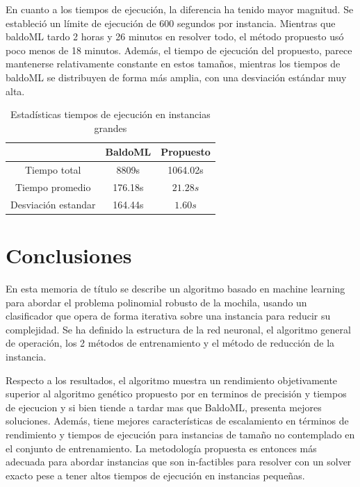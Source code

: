 \documentclass[spanish, a4paper, 12pt, openany,final]{book}
\begin{document}
En cuanto a los tiempos de ejecución, la diferencia ha tenido mayor magnitud. Se estableció un límite de ejecución de 600 segundos por instancia. Mientras que baldoML tardo 2 horas y 26  minutos en resolver todo, el método propuesto usó poco menos de 18 minutos. Además, el tiempo de ejecución del propuesto, parece mantenerse relativamente constante en estos tamaños, mientras los tiempos de baldoML se distribuyen de forma más amplia, con una desviación estándar muy alta.


\begin{table}[H]
	\centering
	\begin{tabular}{|c|c|c|}
		\hline
		&BaldoML& Propuesto\\
		\hline
		Tiempo total & 8809s & 1064.02s\\
		\hline
		Tiempo promedio&176.18s & $21.28s$ \\
		\hline
		Desviación estandar &164.44s& $1.60s$\\
		\hline
	\end{tabular}
	\caption{Estadísticas tiempos de ejecución en instancias grandes}
\end{table}







\chapter{Conclusiones}
En esta memoria de título se describe un algoritmo basado en machine learning para abordar el problema polinomial robusto de la mochila, usando un clasificador que opera de forma iterativa sobre una instancia para reducir su complejidad. Se ha definido la estructura de la red neuronal, el algoritmo general de operación, los 2 métodos de entrenamiento y el método de reducción de la instancia.
 
Respecto a los resultados, el algoritmo muestra un rendimiento objetivamente superior al algoritmo genético propuesto por \cite{baldo_polynomial_2023} en terminos de precisión y tiempos de ejecucion y si bien tiende a tardar mas que BaldoML, presenta mejores soluciones. Además, tiene mejores características de escalamiento en términos de rendimiento y tiempos de ejecución para instancias de tamaño no contemplado en el conjunto de entrenamiento. La metodología propuesta es entonces más adecuada para abordar instancias que son in-factibles para resolver con un solver exacto pese a tener altos tiempos de ejecución en instancias pequeñas.
\end{document}
